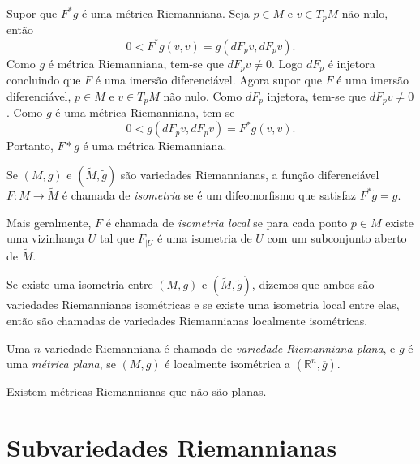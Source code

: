 \begin{demonstracao}
	Supor que $F^*g$ é uma métrica Riemanniana. Seja $p \in M$ e $v \in T_pM$ não nulo, então
	\begin{equation*}
		0 < F^*g(v,v) = g(dF_p v, dF_p v).
	\end{equation*}
	Como $g$ é métrica Riemanniana, tem-se que $dF_p v \neq 0$. Logo $dF_p$ é injetora concluindo que $F$ é uma imersão diferenciável.
	Agora supor que $F$ é uma imersão diferenciável, $p \in M$ e $v \in T_pM$ não nulo. Como $dF_p$ injetora, tem-se que $dF_p v \neq 0$. Como $g$ é uma métrica Riemanniana, tem-se
	\begin{equation*}
		0 < g(dF_p v, dF_p v) = F^*g(v,v).
	\end{equation*}
	Portanto, $F* g$ é uma métrica Riemanniana.
\end{demonstracao}

\begin{definicao}
	Se $(M,g)$ e $(\tilde{M}, \tilde{g})$ são variedades Riemannianas, a função diferenciável $F: M \rightarrow \tilde{M}$ é chamada de \emph{isometria} se é um difeomorfismo que satisfaz $F^* \tilde{g} = g$.
\end{definicao}

\begin{observacao}
	Mais geralmente, $F$ é chamada de \emph{isometria local} se para cada ponto $p \in M$ existe uma vizinhança $U$ tal que $F_{|U}$ é uma isometria de $U$ com um subconjunto aberto de $\tilde{M}$.
\end{observacao}

\begin{observacao}
	Se existe uma isometria entre $(M,g)$ e $(\tilde{M}, \tilde{g})$, dizemos que ambos são variedades Riemannianas isométricas e se existe uma isometria local entre elas, então são chamadas de variedades Riemannianas localmente isométricas.
\end{observacao}

\begin{definicao}
	Uma $n$-variedade Riemanniana é chamada de \emph{variedade Riemanniana plana}, e $g$ é uma \emph{métrica plana}, se $(M,g)$ é localmente isométrica a $(\mathbb{R}^n,\overline{g})$.
\end{definicao}

\begin{observacao}
	Existem métricas Riemannianas que não são planas.
\end{observacao}

\section{Subvariedades Riemannianas}

